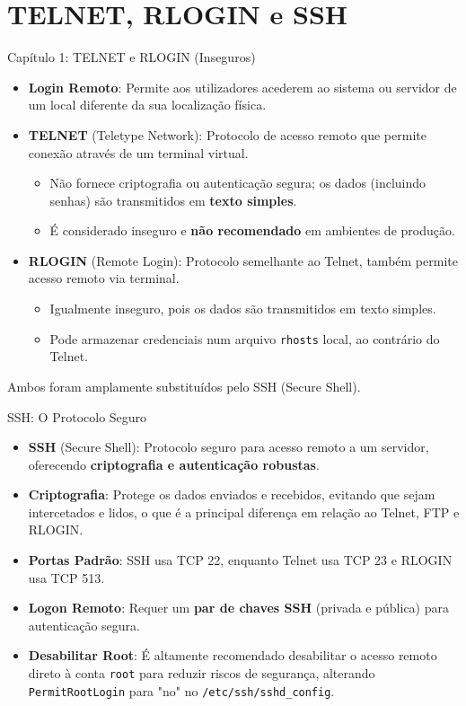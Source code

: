 \documentclass{beamer}
\begin{document}
	\section{TELNET, RLOGIN e SSH}
	\begin{frame}{Capítulo 1: TELNET e RLOGIN (Inseguros)}
		\begin{itemize}
			\item \textbf{Login Remoto}: Permite aos utilizadores acederem ao sistema ou servidor de um local diferente da sua localização física.
			\item \textbf{TELNET} (Teletype Network): Protocolo de acesso remoto que permite conexão através de um terminal virtual.
			\begin{itemize}
				\item Não fornece criptografia ou autenticação segura; os dados (incluindo senhas) são transmitidos em \textbf{texto simples}.
				\item É considerado inseguro e \textbf{não recomendado} em ambientes de produção.
			\end{itemize}
			\item \textbf{RLOGIN} (Remote Login): Protocolo semelhante ao Telnet, também permite acesso remoto via terminal.
			\begin{itemize}
				\item Igualmente inseguro, pois os dados são transmitidos em texto simples.
				\item Pode armazenar credenciais num arquivo \texttt{rhosts} local, ao contrário do Telnet.
			\end{itemize}
		\end{itemize}
		\vspace{0.5cm}
		\centering
		\alert{Ambos foram amplamente substituídos pelo SSH (Secure Shell).}
	\end{frame}
	
	\begin{frame}{SSH: O Protocolo Seguro}
		\begin{itemize}
			\item \textbf{SSH} (Secure Shell): Protocolo seguro para acesso remoto a um servidor, oferecendo \textbf{criptografia e autenticação robustas}.
			\item \textbf{Criptografia}: Protege os dados enviados e recebidos, evitando que sejam intercetados e lidos, o que é a principal diferença em relação ao Telnet, FTP e RLOGIN.
			\item \textbf{Portas Padrão}: SSH usa TCP 22, enquanto Telnet usa TCP 23 e RLOGIN usa TCP 513.
			\item \textbf{Logon Remoto}: Requer um \textbf{par de chaves SSH} (privada e pública) para autenticação segura.
			\item \textbf{Desabilitar Root}: É altamente recomendado desabilitar o acesso remoto direto à conta \texttt{root} para reduzir riscos de segurança, alterando \texttt{PermitRootLogin} para "no" no \texttt{/etc/ssh/sshd\_config}.
		\end{itemize}
	\end{frame}
	
\end{document}
